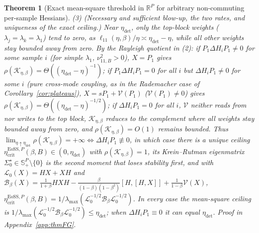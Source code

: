 \documentclass[11pt]{article}
\newtheorem{theorem}{Theorem}
\theoremstyle{remark}
\newcommand{\etacrit}{\eta_{\mathrm{crit}}}
\newcommand{\R}{\mathbb{R}}
\begin{document}
\begin{theorem}[Exact mean-square threshold in $\R^P$ for arbitrary non-commuting per-sample Hessians]
(3) \emph{(Necessary and sufficient blow-up, the two rates, and uniqueness of the exact ceiling.)} Near $\eta_{\mathrm{det}}$, only the top-block weights ($\lambda_j=\lambda_k=\lambda_1$) tend to zero, as $\ell_{11}(\eta,\beta)/\eta\asymp\eta_{\mathrm{det}}-\eta$, while all other weights stay bounded away from zero. By the Rayleigh quotient in (2): if $P_1\Delta H_iP_1\ne0$ for some sample $i$ (for simple $\lambda_1$, $\nu_{11,B}^2>0$), $X=P_1$ gives $\rho(\mathcal K_{\eta,\beta})=\Theta((\eta_{\mathrm{det}}-\eta)^{-1})$; if $P_1\Delta H_iP_1=0$ for all $i$ but $\Delta H_iP_1\ne0$ for some $i$ (pure cross-mode coupling, as in the Rademacher case of Corollary~\ref{cor:plateaus}), $X=sP_1+\mathcal V(P_1)$ ($\mathcal V(P_1)\ne0$) gives $\rho(\mathcal K_{\eta,\beta})=\Theta((\eta_{\mathrm{det}}-\eta)^{-1/2})$; if $\Delta H_iP_1=0$ for all $i$, $\mathcal V$ neither reads from nor writes to the top block, $\mathcal K_{\eta,\beta}$ reduces to the complement where all weights stay bounded away from zero, and $\rho(\mathcal K_{\eta,\beta})=O(1)$ remains bounded. Thus $\lim_{\eta\uparrow\eta_{\mathrm{det}}}\rho(\mathcal K_{\eta,\beta})=+\infty\iff\Delta H_iP_1\not\equiv0$, in which case there is a unique ceiling $\etacrit^{\mathrm{EoSS},P}(\beta,B)\in(0,\eta_{\mathrm{det}})$ with $\rho(\mathcal K_{\eta,\beta})=1$, its Krein--Rutman eigenmatrix $\Sigma_0^\star\in\mathbb S_+^P\setminus\{0\}$ is the second moment that loses stability first, and with $\mathcal L_0(X)=HX+XH$ and $\mathcal B_\beta(X)=\frac1{1+\beta}HXH-\frac{\beta}{(1-\beta)(1-\beta^2)}[H,[H,X]]+\frac1{1-\beta}\mathcal V(X)$, $\etacrit^{\mathrm{EoSS},P}(\beta,B)=1/\lambda_{\max}(\mathcal L_0^{-1/2}\mathcal B_\beta\mathcal L_0^{-1/2})$. In every case the mean-square ceiling is $1/\lambda_{\max}(\mathcal L_0^{-1/2}\mathcal B_\beta\mathcal L_0^{-1/2})\le\eta_{\mathrm{det}}$; when $\Delta H_iP_1\equiv0$ it can equal $\eta_{\mathrm{det}}$. Proof in Appendix~\ref{app:thmFG}.
\end{theorem}
\end{document}
